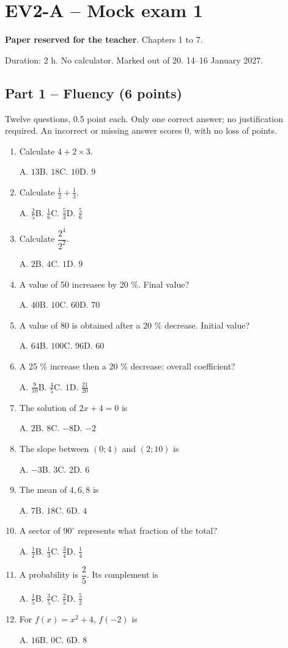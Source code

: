 \mxnewpage\section*{EV2-A -- Mock exam 1}\label{EV2-A}
\textbf{Paper reserved for the teacher}. Chapters 1 to 7.\par Duration: 2 h. No calculator. Marked out of 20. 14--16 January 2027.
\subsection*{Part 1 -- Fluency (6 points)}
Twelve questions, 0.5 point each. Only one correct answer; no justification required. An incorrect or missing answer scores 0, with no loss of points.
\begin{enumerate}
\item Calculate $4+2\times3$.\par A. $13$\quad B. $18$\quad C. $10$\quad D. $9$
\item Calculate $\frac12+\frac13$.\par A. $\frac{2}{5}$\quad B. $\frac{1}{6}$\quad C. $\frac{5}{3}$\quad D. $\frac{5}{6}$
\item Calculate $\dfrac{2^4}{2^{2}}$.\par A. $2$\quad B. $4$\quad C. $1$\quad D. $9$
\item A value of 50 increases by 20 \%. Final value?\par A. $40$\quad B. $10$\quad C. $60$\quad D. $70$
\item A value of 80 is obtained after a 20 \% decrease. Initial value?\par A. $64$\quad B. $100$\quad C. $96$\quad D. $60$
\item A 25 \% increase then a 20 \% decrease: overall coefficient?\par A. $\frac{9}{10}$\quad B. $\frac{4}{5}$\quad C. $1$\quad D. $\frac{21}{20}$
\item The solution of $2x+4=0$ is\par A. $2$\quad B. $8$\quad C. $-8$\quad D. $-2$
\item The slope between $(0;4)$ and $(2;10)$ is\par A. $-3$\quad B. $3$\quad C. $2$\quad D. $6$
\item The mean of $4, 6, 8$ is\par A. $7$\quad B. $18$\quad C. $6$\quad D. $4$
\item A sector of $90^\circ$ represents what fraction of the total?\par A. $\frac{1}{2}$\quad B. $\frac{1}{3}$\quad C. $\frac{3}{4}$\quad D. $\frac{1}{4}$
\item A probability is $\dfrac{2}{5}$. Its complement is\par A. $\frac{1}{5}$\quad B. $\frac{3}{5}$\quad C. $\frac{2}{5}$\quad D. $\frac{5}{2}$
\item For $f(x)=x^2+4$, $f(-2)$ is\par A. $16$\quad B. $0$\quad C. $6$\quad D. $8$
\end{enumerate}

